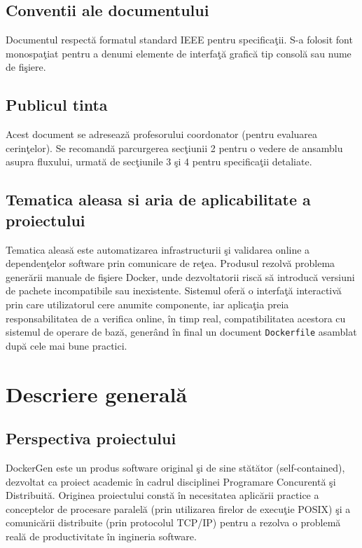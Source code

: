 \documentclass[12pt, a4paper]{article}
\begin{document}
\subsection{Conventii ale documentului}

Documentul respect\u{a} formatul standard IEEE pentru specifica\c{t}ii. S-a folosit font monospa\c{t}iat pentru
a denumi elemente de interfa\c{t}\u{a} grafic\u{a} tip consol\u{a} sau nume de fi\c{s}iere.

\subsection{Publicul tinta}

Acest document se adreseaz\u{a} profesorului coordonator (pentru evaluarea cerin\c{t}elor). Se recomand\u{a}
parcurgerea sec\c{t}iunii 2 pentru o vedere de ansamblu asupra fluxului, urmat\u{a} de sec\c{t}iunile 3 \c{s}i 4 pentru
specifica\c{t}ii detaliate.

\subsection{Tematica aleasa si aria de aplicabilitate a proiectului}

Tematica aleas\u{a} este automatizarea infrastructurii \c{s}i validarea online a dependen\c{t}elor software prin
comunicare de re\c{t}ea. Produsul rezolv\u{a} problema gener\u{a}rii manuale de fi\c{s}iere Docker, unde dezvoltatorii
risc\u{a} s\u{a} introduc\u{a} versiuni de pachete incompatibile sau inexistente. Sistemul ofer\u{a} o interfa\c{t}\u{a}
interactiv\u{a} prin care utilizatorul cere anumite componente, iar aplica\c{t}ia preia responsabilitatea de a
verifica online, \^{i}n timp real, compatibilitatea acestora cu sistemul de operare de baz\u{a}, generând \^{i}n
final un document \texttt{Dockerfile} asamblat dup\u{a} cele mai bune practici.

\section{Descriere general\u{a}}

\subsection{Perspectiva proiectului}

DockerGen este un produs software original \c{s}i de sine st\u{a}t\u{a}tor (self-contained), dezvoltat ca proiect
academic \^{i}n cadrul disciplinei Programare Concurent\u{a} \c{s}i Distribuit\u{a}. Originea proiectului const\u{a} \^{i}n
necesitatea aplic\u{a}rii practice a conceptelor de procesare paralel\u{a} (prin utilizarea firelor de execu\c{t}ie POSIX)
\c{s}i a comunic\u{a}rii distribuite (prin protocolul TCP/IP) pentru a rezolva o problem\u{a} real\u{a} de productivitate
\^{i}n ingineria software.
\end{document}
